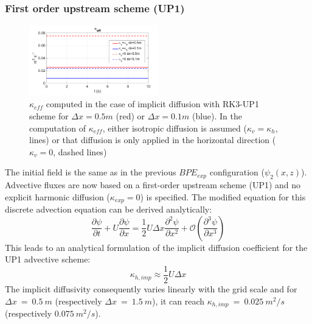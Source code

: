 \subsubsection{First order upstream scheme (UP1)}
\begin{figure}[h!]
\centering
\includegraphics[width=0.5\textwidth]{./CHAP_BPE/AGBPE_numlab3.png}
\caption{$\kappa_{eff}$ computed in the case of implicit diffusion with RK3-UP1 scheme for $\Delta x=0.5m$ (red) or $\Delta x=0.1m$ (blue). In the computation of $\kappa_{eff}$, either isotropic diffusion is assumed ($\kappa_v=\kappa_h$, lines) or that diffusion is only applied in the horizontal direction ($\kappa_v=0$, dashed lines)}
\label{fig3numlab}
\end{figure}
The initial field is the same as in the previous $BPE_{exp}$ configuration ($\psi_2(x,z)$). Advective fluxes are now based on a first-order upstream scheme (UP1) and no explicit harmonic diffusion ($\kappa_{exp}=0$) is specified.
The modified equation for this discrete advection equation can be derived analytically:
\begin{equation}
\frac{\partial \psi}{\partial t}+U \frac{\partial \psi}{\partial x} = \frac{1}{2} U \Delta x  \frac{\partial^2 \psi}{\partial x^2} + \mathcal{O}(\frac{\partial^3 \psi}{\partial x^3})
\end{equation}
This leads to an analytical formulation of the implicit diffusion coefficient for the UP1 advective scheme: 
\begin{equation}
    \displaystyle
    \kappa_{h,imp}\approx\frac{1}{2}U \Delta x
\end{equation}
The implicit diffusivity consequently varies linearly with the grid scale and for $\Delta x\ =\ 0.5\ m$ (respectively $\Delta x\ =\ 1.5\ m$), it can reach $\kappa_{h,imp}\ =\ 0.025\ m^2/s$  (respectively $0.075\ m^2/s$).

